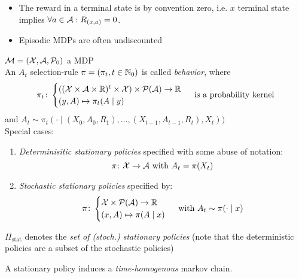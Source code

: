 \begin{remark}\leavevmode
	\begin{itemize}
		\item The reward in a terminal state is by convention zero, i.e. \(x\) terminal state implies \(\forall a\in\mathcal{A}: R_{(x,a)}=0\).
		\item Episodic MDPs are often undiscounted
	\end{itemize}	
\end{remark}
\begin{definition}\(\mathcal{M}=(\mathcal{X},\mathcal{A},\mathcal{P}_0)\) a MDP\\
	 An \(A_t\) selection-rule \(\pi=(\pi_t,t\in\mathbb{N}_0)\) is called \emph{behavior}, where
	 \[ 
	 	\pi_t\colon
	 	\begin{cases}
	 		((\mathcal{X}\times\mathcal{A}\times\mathbb{R})^t\times\mathcal{X})\times\mathcal{P}(\mathcal{A}) \to \mathbb{R} \\
	 		(y,A)\mapsto \pi_t(A\mid y)
	 	\end{cases} \text{ is a probability kernel}
	 \]
	 and \(A_t\sim \pi_t(\cdot\mid (X_0,A_0,R_1), \dots,(X_{t-1},A_{t-1},R_t),X_t))\)\\
	 Special cases:
	 \begin{enumerate}
	 	\item \emph{Determinisitic stationary policies} specified with some abuse of notation:
	 	\[\leavevmode \pi\colon\cX\to\cA \text{ with }A_t=\pi(X_t)\]
	 	\item \emph{Stochastic stationary policies} specified by:
	 	\[\pi\colon \begin{cases}
	 	\mathcal{X}\times\mathcal{P}(\mathcal{A})\to\mathbb{R}\\
	 	(x,A)\mapsto \pi(A\mid x)
	 	\end{cases} \text{ with } A_t\sim\pi(\cdot\mid x)
	 	\]
	 \end{enumerate}
	 \(\Pi_{\text{stat}}\) denotes the \emph{set of (stoch.) stationary policies} (note that the deterministic policies are a subset of the stochastic policies)
\end{definition}
\begin{remark}
A stationary policy induces a \emph{time-homogenous} markov chain.
\end{remark}

\endinput
